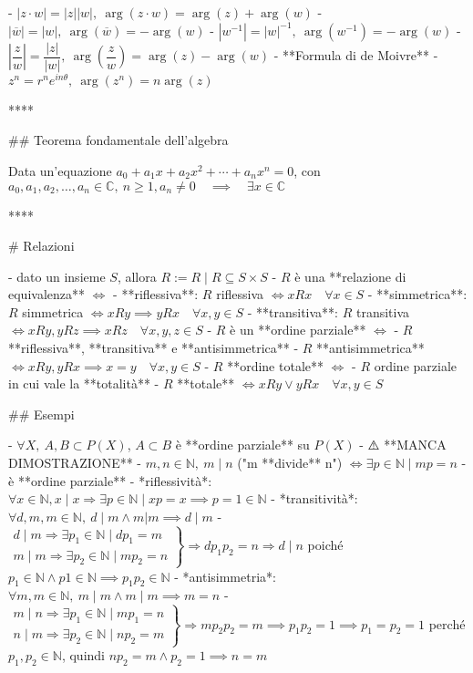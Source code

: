 - \(|z \cdot w|=|z||w|, \ \arg(z\cdot w)=\arg(z) + \arg(w)\)
- \(|\overline{w}|=|w|, \ \arg(\overline{w})=-\arg(w)\)
- \(|w^{-1}|={|w|}^{-1},\  \arg(w^{-1})=-\arg(w)\)
- \(\left|\dfrac{z}{w}\right|=\dfrac{|z|}{|w|}, \ \arg\left(\dfrac{z}{w}\right)=\arg(z) - \arg(w)\)
- **Formula di de Moivre**
  - \( z^{n}=r^{n} e^{i n \theta}, \ \arg \left(z^{n}\right)=n \arg (z) \)

****

## Teorema fondamentale dell'algebra

Data un'equazione \( a_{0}+a_{1} x+a_{2} x^{2}+\cdots+a_{n} x^{n}=0 \), con \( a_{0}, a_{1}, a_{2}, \ldots, a_{n} \in \mathbb{C}, \ n \geq 1, a_n \neq 0 \quad \implies \quad \exists x \in \mathbb{C}\) 

****

# Relazioni

- dato un insieme \(S\), allora \(R := R \mid R \subseteq S \times S\)
- \(R\) è una **relazione di equivalenza** \(\iff \)
  - **riflessiva**: $R$ riflessiva $\iff xRx \quad \forall x \in S$
  - **simmetrica**: $R$ simmetrica $\iff xRy \implies yRx \quad \forall x, y \in S$
  - **transitiva**: $R$ transitiva $\iff xRy, yRz \implies xRz \quad \forall x, y, z \in S$
- $R$ è un **ordine parziale** $\iff$
  - $R$ **riflessiva**, **transitiva** e **antisimmetrica**
    - $R$ **antisimmetrica** $\iff xRy, yRx \implies x=y \quad \forall x, y \in S$
- $R$ **ordine totale** $\iff$ 
  - $R$ ordine parziale in cui vale la **totalità**
    - $R$ **totale** $\iff xRy \lor yRx \quad \forall x, y \in S$

## Esempi

  - $\forall X, \ A, B \subset P(X)$,  $A \subset B$ è **ordine parziale** su $P(X)$
    - ⚠️ **MANCA DIMOSTRAZIONE**
  - $m, n \in \mathbb{N}, \ m \mid n$ ("m **divide** n") $\iff \exists p \in \mathbb{N} \mid mp = n$
    - è **ordine parziale**
      - *riflessività*: \( \forall x \in \mathbb{N}, x\mid x \Rightarrow \exists p \in \mathbb{N} \mid  x p=x \implies p = 1 \in \mathbb{N}\)
      - *transitività*: \( \forall d, m, m \in \mathbb{N}, \  d \mid m \wedge m| m \implies d \mid m \)
        -  \( \left.\begin{array}{l}d \mid m \Rightarrow \exists p_{1} \in \mathbb{N}\mid d p_{1}=m \\ m\mid m \Rightarrow \exists p_{2} \in \mathbb{N}\mid m p_{2}=n\end{array}\right\} \Rightarrow d p_{1} p_{2}=n \Rightarrow d \mid n \) poiché \(p_1 \in \mathbb{N} \land p1 \in \mathbb{N} \implies p_1 p_2 \in \mathbb{N}\)
      -  *antisimmetria*: \( \forall m, m \in \mathbb{N}, \ m\mid m \wedge m\mid m \implies m=n \)
        -  \( \left.\begin{array}{l}m\mid n \Rightarrow \exists p_{1} \in \mathbb{N}\mid m p_{1}=n \\ n\mid m \Rightarrow \exists p_{2} \in \mathbb{N}\mid n p_{2}=m\end{array}\right\} \Rightarrow m p_{2} p_{2}=m \implies p_1 p_2 = 1 \implies p_1 = p_2 = 1\) perché \(p_1, p_2 \in \mathbb{N}\), quindi \(np_2=m \land p_2 = 1 \implies n =m\)

